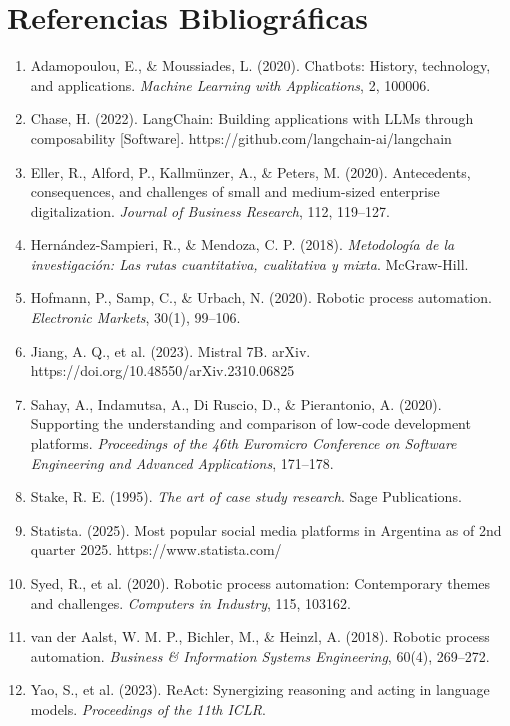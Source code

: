 \documentclass[12pt,a4paper]{report}
\begin{document}
\chapter*{Referencias Bibliográficas}

\begin{enumerate}[label=\arabic*.]
\item Adamopoulou, E., \& Moussiades, L. (2020). Chatbots: History, technology, and applications. \textit{Machine Learning with Applications}, 2, 100006.
\item Chase, H. (2022). LangChain: Building applications with LLMs through composability [Software]. https://github.com/langchain-ai/langchain
\item Eller, R., Alford, P., Kallmünzer, A., \& Peters, M. (2020). Antecedents, consequences, and challenges of small and medium-sized enterprise digitalization. \textit{Journal of Business Research}, 112, 119--127.
\item Hernández-Sampieri, R., \& Mendoza, C. P. (2018). \textit{Metodología de la investigación: Las rutas cuantitativa, cualitativa y mixta}. McGraw-Hill.
\item Hofmann, P., Samp, C., \& Urbach, N. (2020). Robotic process automation. \textit{Electronic Markets}, 30(1), 99--106.
\item Jiang, A. Q., et al. (2023). Mistral 7B. arXiv. https://doi.org/10.48550/arXiv.2310.06825
\item Sahay, A., Indamutsa, A., Di Ruscio, D., \& Pierantonio, A. (2020). Supporting the understanding and comparison of low-code development platforms. \textit{Proceedings of the 46th Euromicro Conference on Software Engineering and Advanced Applications}, 171--178.
\item Stake, R. E. (1995). \textit{The art of case study research}. Sage Publications.
\item Statista. (2025). Most popular social media platforms in Argentina as of 2nd quarter 2025. https://www.statista.com/
\item Syed, R., et al. (2020). Robotic process automation: Contemporary themes and challenges. \textit{Computers in Industry}, 115, 103162.
\item van der Aalst, W. M. P., Bichler, M., \& Heinzl, A. (2018). Robotic process automation. \textit{Business \& Information Systems Engineering}, 60(4), 269--272.
\item Yao, S., et al. (2023). ReAct: Synergizing reasoning and acting in language models. \textit{Proceedings of the 11th ICLR}.
\end{enumerate}
\end{document}
